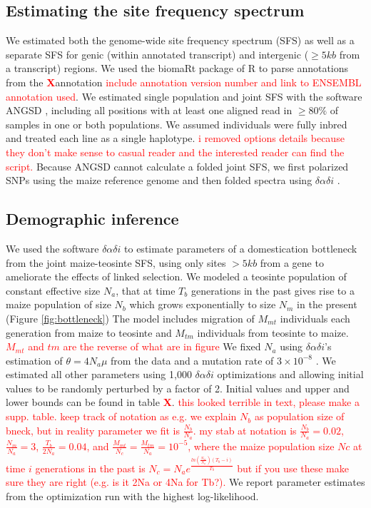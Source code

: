 \documentclass{pnastwo}
\newcommand{\jri}[1]{\textcolor{red}{\scriptsize #1}}
\newcommand{\X}{\textcolor{red}{\bf X}}
\begin{document}
\begin{article}
\begin{materials}
\subsection{Estimating the site frequency spectrum}
We estimated both the genome-wide site frequency spectrum (SFS) as well as a separate SFS for genic (within annotated transcript) and intergenic ($\geq 5kb$ from a transcript) regions. 
We used the biomaRt package \cite{durinck2009,durinck2005} of R \cite{R2014} to parse annotations from the \X annotation \jri{include annotation version number and link to ENSEMBL annotation used}. 
We estimated single population and joint SFS with the software ANGSD \cite{korneliussen2014}, including all positions with at least one aligned read in $\geq 80\%$ of samples in one or both populations.
We assumed individuals were fully inbred and treated each line as a single haplotype. \jri{i removed options details because they don't make sense to casual reader and the interested reader can find the script. }
Because ANGSD cannot calculate a folded joint SFS, we first polarized SNPs using the maize reference genome and then folded spectra using $\delta\alpha\delta{i}$ \cite{gutenkunst2009}.

\subsection{Demographic inference}
We used the software $\delta\alpha\delta{i}$ \cite{gutenkunst2009} to estimate parameters of a domestication bottleneck from the joint maize-teosinte SFS, using only sites $>5 kb$ from a gene to ameliorate the effects of linked selection.
We modeled a teosinte population of constant effective size $N_a$, that at time $T_b$ generations in the past gives rise to a maize population of size $N_b$ which grows exponentially to size $N_m$ in the present (Figure \ref{fig:bottleneck})
The model includes migration of $M_{mt}$ individuals each generation from maize to teosinte and $M_{tm}$ individuals from teosinte to maize.  \jri{$M_{mt}$ and $tm$ are the reverse of what are in figure}
We fixed $N_a$ using $\delta\alpha\delta{i}$'s estimation of $\theta=4N_a\mu$ from the data and a mutation rate of $3 \times 10^{-8}$ \cite{clark2005}. 
We estimated all other parameters using 1,000 $\delta\alpha\delta{i}$ optimizations and allowing initial values to be randomly perturbed by a factor of 2.  
Initial values and upper and lower bounds can be found in table \X. \jri{this looked terrible in text, please make a supp. table.  keep track of notation as e.g. we explain $N_b$ as population size of bneck, but in reality parameter we fit is $\frac{N_b}{N_a}$. my stab at notation is $\frac{N_b}{N_a}=0.02$, $\frac{N_m}{N_a}=3$, $\frac{T_b}{2N_a}=0.04$, and $\frac{M_{mt}}{N_c}=\frac{M_{tm}}{N_a}=10^{-5}$, where the maize population size $Nc$ at time $i$ generations in the past is $N_c=N_ae^{\frac{ln(\frac{N_m}{N_a})(T_b-i)}{T_b}}$ but if you use these make sure they are right (e.g. is it 2Na or 4Na for Tb?).}
We report parameter estimates from the optimization run with the highest log-likelihood.


\end{materials}
\end{article}
\end{document}
